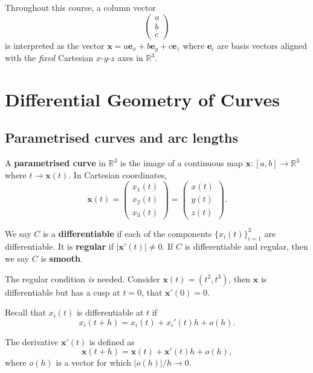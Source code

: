 Throughout this course, a column vector
\[
    \begin{pmatrix}
        a \\ b \\ c
    \end{pmatrix}
\]
is interpreted as the vector $ \mathbf{x} = a \mathbf{e}_x+b \mathbf{e}_y+ c \mathbf{e}_z $ where $ \mathbf{e}_i $ are basis vectors aligned with the \textit{fixed} Cartesian $x$-$y$-$z$ axes in $ \mathbb{R}^{3} $.
\section{Differential Geometry of Curves}
\subsection{Parametrised curves and arc lengths}

\begin{definition}
    A \textbf{parametrised curve} in $ \mathbb{R}^{3} $ is the image of a continuous map $ \mathbf{x}: [a,b]\to \mathbb{R}^{3} $ where $ t \to \mathbf{x}(t) $. In Cartesian coordinates,
    \[
        \mathbf{x}(t)=\begin{pmatrix}
            x_1(t) \\ x_2(t) \\ x_3(t)
        \end{pmatrix} = \begin{pmatrix}
            x(t) \\ y(t) \\ z(t)
        \end{pmatrix}.
    \]
\end{definition}
\begin{definition}
    We say $C$ is a \textbf{differentiable} if each of the components $ \{x_i(t)\}_{i=1}^3 $ are differentiable. It is \textbf{regular} if $ |\mathbf{x}'(t)|\neq 0 $. If $C$ is differentiable and regular, then we say $C$ is \textbf{smooth}.
\end{definition}
\begin{note}
    The regular condition \textit{is} needed. Consider $ \mathbf{x}(t)=(t^2,t^3) $, then $ \mathbf{x} $ is differentiable but has a cusp at $t=0$, that $ \mathbf{x}'(0)=0 $.
\end{note}
Recall that $x_i(t)$ is differentiable at $t$ if
\[
    x_i(t+h) = x_i(t) + x_i'(t) h+o(h).
\]
\begin{definition}
    The derivative $ \mathbf{x}'(t) $ is defined as
    \[
        \mathbf{x}(t+h) = \mathbf{x}(t) + \mathbf{x}'(t)h + o(h),
    \]
    where $o(h)$ is a vector for which $ |o(h)|/h\to 0 $.
\end{definition}
